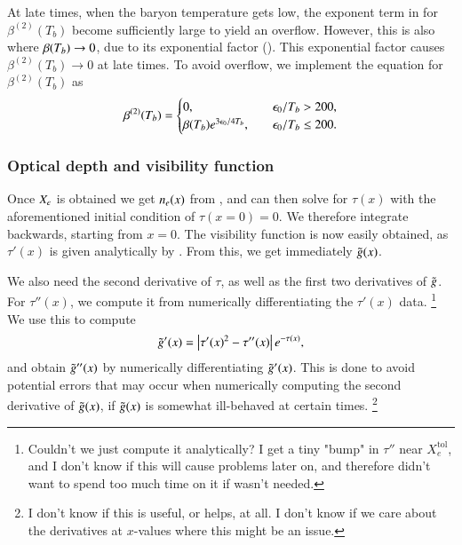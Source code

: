 At late times, when the baryon temperature gets low, the exponent term in  for $\beta^{(2)}(T_b)$ become sufficiently large to yield an overflow. However, this is also where $\beta(T_b)\to0$, due to its exponential factor (). This exponential factor causes $\beta^{(2)}(T_b)\to0$ at late times. To avoid overflow, we implement the equation for $\beta^{(2)}(T_b)$ as 
\begin{equation}
    \beta^{(2)}(T_b) = \begin{cases}
        0,\quad &\epsilon_0/T_b > 200, \\
        \beta(T_b) e^{3\epsilon_0/4T_b},\quad &\epsilon_0/T_b \leq 200.
    \end{cases}
\end{equation} 


\subsubsection{Optical depth and visibility function} \label{sssec:M2:implementations:optical_depth}
Once $X_e$ is obtained we get $n_e(x)$ from , and can then solve  for $\tau(x)$ with the aforementioned initial condition of $\tau(x=0)=0$. We therefore integrate backwards, starting from $x=0$. The visibility function is now easily obtained, as $\tau'(x)$ is given analytically by . From this, we get immediately $\tilde{g}(x)$. 

We also need the second derivative of $\tau$, as well as the first two derivatives of $\tilde{g}$. For $\tau''(x)$, we compute it from numerically differentiating the $\tau'(x)$ data. \footnote{Couldn't we just compute it analytically? I get a tiny "bump" in $\tau''$ near $X_e^\mathrm{tol}$, and I don't know if this will cause problems later on, and therefore didn't want to spend too much time on it if wasn't needed.} We use this to compute 
\begin{equation} \label{eq:M2:implementations:dg_dx}
    \tilde{g}'(x) = \left| \tau'(x)^2 - \tau''(x) \right| e^{-\tau(x)}, 
\end{equation}
and obtain $\tilde{g}''(x)$ by numerically differentiating $\tilde{g}'(x)$. This is done to avoid potential errors that may occur when numerically computing the second derivative of $\tilde{g}(x)$, if $\tilde{g}(x)$ is somewhat ill-behaved at certain times. \footnote{I don't know if this is useful, or helps, at all. I don't know if we care about the derivatives at $x$-values where this might be an issue.} 